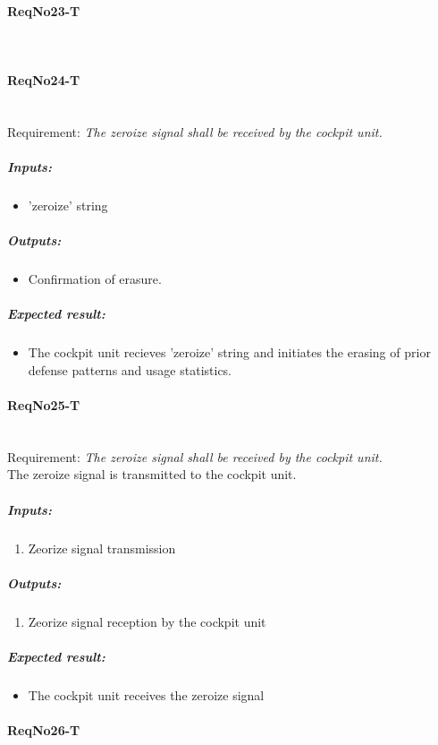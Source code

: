 \paragraph{ReqNo23-T}\mbox{}\\ %


\paragraph{ReqNo24-T}\mbox{}\\ %
Requirement: \textit{The zeroize signal shall be received by the cockpit unit.}\\
	\subparagraph{Inputs:}
	\begin{itemize}
	\item 'zeroize' string
	\end{itemize}
	\subparagraph{Outputs:}
	\begin{itemize}
	\item Confirmation of erasure.
	\end{itemize}
	\subparagraph{Expected result:}
	\begin{itemize}
	\item The cockpit unit recieves 'zeroize' string and initiates the erasing of prior defense patterns and usage statistics.
	\end{itemize}


\paragraph{ReqNo25-T}\mbox{}\\ %
Requirement: \textit{The zeroize signal shall be received by the cockpit unit.}\\

The zeroize signal is transmitted to the cockpit unit. 
\subparagraph{Inputs:}
	\begin{enumerate}
	\item Zeorize signal transmission
	\end{enumerate}
\subparagraph{Outputs:}
	\begin{enumerate}
	\item Zeorize signal reception by the cockpit unit
	\end{enumerate}
\subparagraph{Expected result:}
	\begin{itemize}
	\item The cockpit unit receives the zeroize signal 
	\end{itemize}

\paragraph{ReqNo26-T}\mbox{}\\ %

